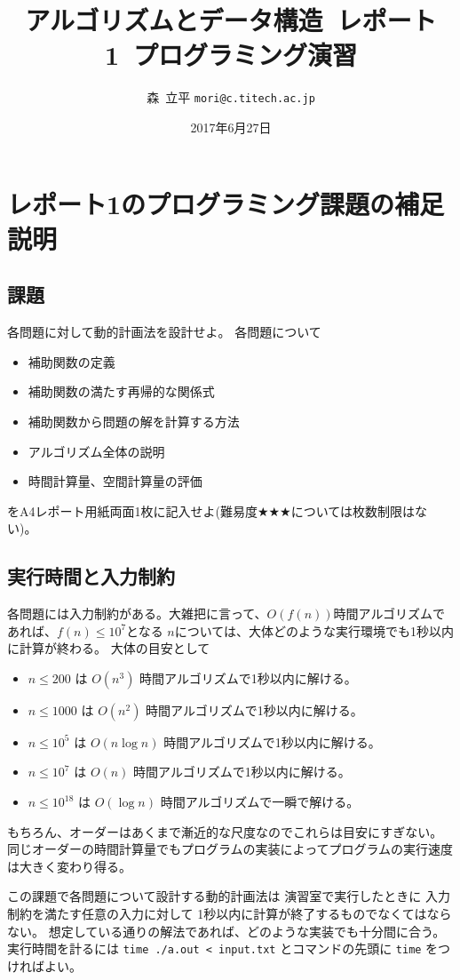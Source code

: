 \documentclass[a4paper,twoside,onecolumn,openany,article,10pt]{memoir}
\title{アルゴリズムとデータ構造~レポート1~プログラミング演習}
\date{2017年6月27日}
\author{森~立平 \texttt{mori@c.titech.ac.jp}}
\theoremstyle{remark}
\begin{document}
\maketitle

\section{レポート1のプログラミング課題の補足説明}
\subsection{課題}
各問題に対して動的計画法を設計せよ。
各問題について
\begin{itemize}
\item 補助関数の定義
\item 補助関数の満たす再帰的な関係式
\item 補助関数から問題の解を計算する方法
\item アルゴリズム全体の説明
\item 時間計算量、空間計算量の評価
\end{itemize}
をA4レポート用紙両面1枚に記入せよ(難易度$\bigstar\bigstar\bigstar$については枚数制限はない)。
\fi

\subsection{実行時間と入力制約}
各問題には入力制約がある。大雑把に言って、$O(f(n))$時間アルゴリズムであれば、$f(n)\le 10^7$となる $n$については、大体どのような実行環境でも1秒以内に計算が終わる。
大体の目安として
\begin{itemize}
\item $n\le 200$ は $O(n^3)$ 時間アルゴリズムで1秒以内に解ける。
\item $n\le 1000$ は $O(n^2)$ 時間アルゴリズムで1秒以内に解ける。
\item $n\le 10^5$ は $O(n\log n)$ 時間アルゴリズムで1秒以内に解ける。
\item $n\le 10^7$ は $O(n)$ 時間アルゴリズムで1秒以内に解ける。
\item $n\le 10^{18}$ は $O(\log n)$ 時間アルゴリズムで一瞬で解ける。
\end{itemize}
もちろん、オーダーはあくまで漸近的な尺度なのでこれらは目安にすぎない。
同じオーダーの時間計算量でもプログラムの実装によってプログラムの実行速度は大きく変わり得る。

この課題で各問題について設計する動的計画法は
演習室で実行したときに
入力制約を満たす任意の入力に対して
1秒以内に計算が終了するものでなくてはならない。
想定している通りの解法であれば、どのような実装でも十分間に合う。
実行時間を計るには \texttt{time ./a.out < input.txt} とコマンドの先頭に \texttt{time} をつければよい。
\end{document}

